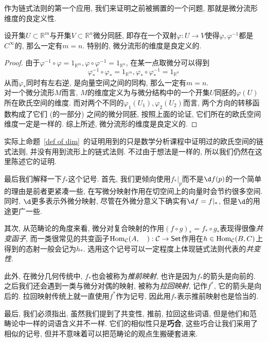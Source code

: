 作为链式法则的第一个应用, 我们来证明之前被搁置的一个问题, 那就是微分流形维度的良定义性.
\begin{prop}\label{def of dim}
    设开集$U\subset\mathbb{R}^m$与开集$V\subset\mathbb{R}^n$微分同胚, 即存在一个双射$\varphi:U\to V$使得$\varphi,\varphi^{-1}$都是$C^\infty$的, 那么一定有$m=n$.
    特别的, 微分流形的维度是良定义的.
\end{prop}
\begin{proof}
    由于$\varphi^{-1}\circ\varphi=1_{\mathbb{R}^m},\varphi\circ\varphi^{-1}=1_{\mathbb{R}^n}$, 在某一点取微分可以得到
    \[\varphi^{-1}_*\circ\varphi_*=1_{\mathbb{R}^m},\varphi_*\circ\varphi^{-1}_*=1_{\mathbb{R}^n}\]
    从而$\varphi_*$同时有左右逆, 是向量空间之间的同构, 那么一定有$m=n$.\\
    对一个微分流形$M$而言, $M$的维度定义为与微分结构中的一个开集$U$同胚的$\varphi(U)$所在欧氏空间的维度.
    而对两个不同的$\varphi_1(U_1),\varphi_2(U_2)$而言, 两个方向的转移函数构成了它们 (的一部分) 之间的微分同胚, 按照上面的论证, 它们所在的欧氏空间维度一定是一样的.
    综上所述, 微分流形的维度是良定义的.
\end{proof}

\begin{rem}
    实际上命题~\ref{def of dim}~的证明用到的只是数学分析课程中证明过的欧氏空间的链式法则, 并没有用到流形上的链式法则.
    不过由于想法是一样的, 所以我们仍然在这里陈述它的证明.
\end{rem}

\begin{rem}
    最后我们解释一下$f_*$这个记号.
    首先, 我们更倾向使用$f_*|_p$而不是$\d f(p)$的一个简单的理由是前者更紧凑一些, 在写微分映射作用在切空间上的向量时会节约很多空间.
    同时, $\d$更多表示外微分映射, 尽管在外微分意义下确实有$\d f=f|_*$, 但是$\d$的用途更广一些.

    其次, 从范畴论的角度来看, 微分对复合映射的作用$(f\circ g)_*=f_*\circ g_*$表现得很像\textit{共变函子}, 而一类很常见的共变函子$\operatorname{Hom}_{\mathcal{C}}(A,\quad):\mathcal{C}\to\mathsf{Set}$作用在$h\in\operatorname{Hom}_{\mathcal{C}}(B,C)$上得到的态射一般会记为$h_*$.
    选用这个记号可以一定程度上体现链式法则代表的\textit{共变性}.

    此外, 在微分几何传统中, $f_*$也会被称为\textit{推前映射}, 也许是因为$f_*$的箭头是向前的.
    之后我们还会遇到一类与微分对偶的映射, 被称为\textit{拉回映射}, 记作$f^*$, 它的箭头是向后的.
    拉回映射传统上就一直使用$f^*$作为记号, 因此用$f_*$表示推前映射也是恰当的.  

    最后, 我们必须指出, 虽然我们提到了共变性, 推前, 拉回这些词语, 但是他们和范畴论中一样的词语含义并不一样.
    它们的相似性只是\textbf{巧合}, 这些巧合让我们采用了相似的记号, 但并不意味着可以把范畴论的观点生搬硬套进来.
\end{rem}

